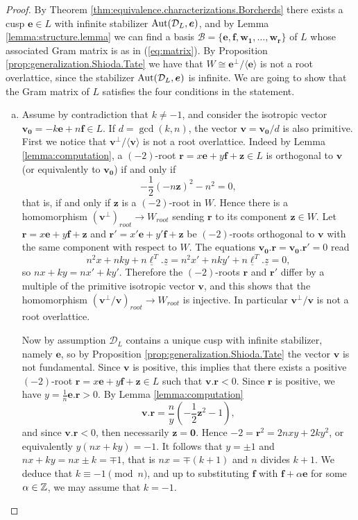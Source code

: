 \documentclass[11pt,letterpaper]{amsart}
\newcommand{\vect}[1]{\boldsymbol{#1}}
\begin{document}
\begin{proof}
By Theorem \ref{thm:equivalence.characterizations.Borcherds} there exists a cusp $\vect{e}\in L$ with infinite stabilizer $\Stabe$, and by Lemma \ref{lemma:structure.lemma} we can find a basis $\mathcal{B}=\{\vect{e},\vect{f},\vect{w_1},\ldots,\vect{w_r}\}$ of $L$ whose associated Gram matrix is as in (\ref{eq:matrix}). By Proposition \ref{prop:generalization.Shioda.Tate} we have that $W\cong \vect{e}^\perp / \langle \vect{e} \rangle$ is not a root overlattice, since the stabilizer $\Stabe$ is infinite. We are going to show that the Gram matrix of $L$ satisfies the four conditions in the statement.

    \begin{enumerate}[(a)]
        \item Assume by contradiction that $k\ne -1$, and consider the isotropic vector $\vect{v_0}=-k\vect{e} + n\vect{f} \in L$. If $d=\gcd(k,n)$, the vector $\vect{v}=\vect{v_0}/d$ is also primitive. First we notice that $\vect{v}^\perp/\langle\vect{v}\rangle$ is not a root overlattice. Indeed by Lemma \ref{lemma:computation}, a $(-2)$-root $\vect{r}=x\vect{e}+y\vect{f}+\vect{z}\in L$ is orthogonal to $\vect{v}$ (or equivalently to $\vect{v_0}$) if and only if 
    $$-\frac{1}{2}(-n\vect{z})^2 - n^2 = 0, $$
    that is, if and only if $\vect{z}$ is a $(-2)$-root in $W$. Hence there is a homomorphism $(\vect{v}^\perp)_{root} \rightarrow W_{root}$ sending $\vect{r}$ to its component $\vect{z}\in W$. Let $\vect{r}=x\vect{e}+y\vect{f}+\vect{z}$ and $\vect{r'}=x'\vect{e}+y'\vect{f}+\vect{z}$ be $(-2)$-roots orthogonal to $\vect{v}$ with the same component with respect to $W$. The equations $\vect{v_0}.\vect{r}=\vect{v_0}.\vect{r'}=0$ read 
    $$n^2x+nky+n\underline{\ell}^T. \underline{z}=n^2x'+nky'+n\underline{\ell}^T. \underline{z}=0,$$
    so $nx+ky=nx'+ky'$. Therefore the $(-2)$-roots $\vect{r}$ and $\vect{r'}$ differ by a multiple of the primitive isotropic vector $\vect{v}$, and this shows that the homomorphism $(\vect{v}^\perp/\vect{v})_{root} \rightarrow W_{root}$ is injective. In particular $\vect{v}^\perp/\vect{v}$ is not a root overlattice.
    
    Now by assumption $\mathcal{D}_L$ contains a unique cusp with infinite stabilizer, namely $\vect{e}$, so by Proposition \ref{prop:generalization.Shioda.Tate} the vector $\vect{v}$ is not fundamental. Since $\vect{v}$ is positive, this implies that there exists a positive $(-2)$-root $\vect{r}=x\vect{e}+y\vect{f}+\vect{z}\in L$ such that $\vect{v}.\vect{r}<0$. Since $\vect{r}$ is positive, we have $y=\frac{1}{n}\vect{e}.\vect{r}>0$. 
    By Lemma \ref{lemma:computation} 
    $$\vect{v}.\vect{r} = \frac{n}{y}\left(-\frac{1}{2} \vect{z}^2 - 1\right),$$
    and since $\vect{v}.\vect{r} <0$, then necessarily $\vect{z}=\vect{0}$. Hence $-2 = \vect{r}^2 = 2nxy +2ky^2$, or equivalently $y(nx+ky)=-1$. It follows that $y=\pm 1$ and $nx+ky = nx\pm k = \mp 1$, that is $nx = \mp (k+1)$ and $n$ divides $k+1$.
    We deduce that $k\equiv -1 \pmod{n}$, and up to substituting $\vect{f}$ with $\vect{f}+\alpha\vect{e}$ for some $\alpha\in \mathbb{Z}$, we may assume that $k=-1$. 
    

\end{enumerate}
\end{proof}
\end{document}
